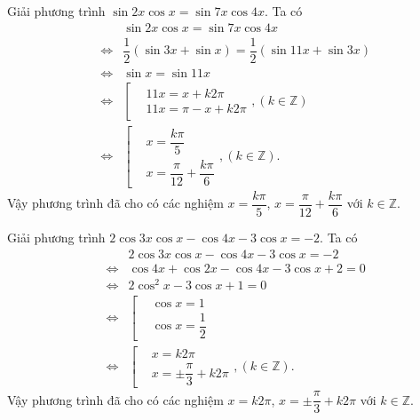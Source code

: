 \begin{bt}%
	Giải phương trình $\sin 2x\cos x=\sin 7x\cos 4x$.
	\loigiai
	{
		Ta có
		\allowdisplaybreaks
		\begin{eqnarray*}
			&& \sin 2x\cos x=\sin 7x\cos 4x \\
			&\Leftrightarrow & \dfrac{1}{2}\left(\sin 3x + \sin x\right) = \dfrac{1}{2}\left(\sin 11x + \sin 3x\right)\\
			&\Leftrightarrow & \sin x = \sin 11x \\
			&\Leftrightarrow & \left[\begin{aligned}&11x=x+k2\pi	\\&11x=\pi-x+k2\pi\end{aligned}\right. , \left(k\in\mathbb{Z}\right)\\
			&\Leftrightarrow & \left[\begin{aligned}&x=\dfrac{k\pi}{5}	\\&x=\dfrac{\pi}{12}+\dfrac{k\pi}{6}\end{aligned}\right. , \left(k\in\mathbb{Z}\right).
		\end{eqnarray*}
		Vậy phương trình đã cho có các nghiệm $x=\dfrac{k\pi}{5}$, $x=\dfrac{\pi}{12}+\dfrac{k\pi}{6}$ với $k\in\mathbb{Z}$.
	}
\end{bt}

\begin{bt}%
	Giải phương trình $2\cos 3x\cos x-\cos 4x-3\cos x=-2$.
	\loigiai
	{
		Ta có
		\allowdisplaybreaks
		\begin{eqnarray*}
			&& 2\cos 3x\cos x-\cos 4x-3\cos x=-2 \\
			&\Leftrightarrow & \cos 4x + \cos 2x - \cos 4x -3\cos x + 2=0 \\
			&\Leftrightarrow & 2\cos^2 x-3\cos x+1=0 \\
			&\Leftrightarrow & \left[\begin{aligned}&\cos x=1 \\&\cos x=\dfrac{1}{2}\end{aligned}\right. \\
			&\Leftrightarrow & \left[\begin{aligned}&x=k2\pi \\&x=\pm\dfrac{\pi}{3}+k2\pi\end{aligned}\right. , \left(k\in\mathbb{Z}\right).
		\end{eqnarray*}
		Vậy phương trình đã cho có các nghiệm $x=k2\pi$, $x=\pm\dfrac{\pi}{3}+k2\pi$ với $k\in\mathbb{Z}$.
	}
\end{bt}

